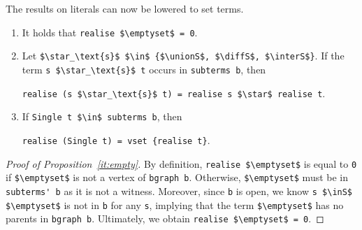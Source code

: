 \documentclass[sigplan,10pt,anonymous,review]{acmart}
\newcommand{\unionS}{\sqcup_\text{s}}
\newcommand{\interS}{\sqcap_\text{s}}
\newcommand{\diffS}{-_\text{s}}
\newcommand{\inS}{\in_\text{s}}
\begin{document}
\noindent The results on literals can now be lowered to set terms.
\begin{enumerate}[label=(\alph*)]
  \item\label{it:empty} It holds that \lstinline!realise $\emptyset$ = 0!.
  \item\label{it:op} Let \lstinline!$\star_\text{s}$ $\in$ {$\unionS$, $\diffS$, $\interS$}!. If the term \lstinline!s $\star_\text{s}$ t! occurs in \lstinline!subterms b!, then
    \begin{center}
    \lstinline!realise (s $\star_\text{s}$ t) = realise s $\star$ realise t!.
    \end{center}
  \item\label{it:single} If \lstinline!Single t $\in$ subterms b!, then
    \begin{center}
    \lstinline!realise (Single t) = vset {realise t}!.
    \end{center}
\end{enumerate}
\begin{proof}[Proof of Proposition~\ref{it:empty}]
  By definition, \lstinline!realise $\emptyset$! is equal to \lstinline!0! if \lstinline!$\emptyset$! is not a vertex of \lstinline!bgraph b!.
  Otherwise, \lstinline!$\emptyset$! must be in \lstinline!subterms' b! as it is not a witness.
  Moreover, since \lstinline!b! is open, we know \lstinline!s $\inS$ $\emptyset$! is not in \lstinline!b! for any \lstinline!s!, implying that the term \lstinline!$\emptyset$! has no parents in \lstinline!bgraph b!.
  Ultimately, we obtain \lstinline!realise $\emptyset$ = 0!.
\end{proof}
\end{document}
